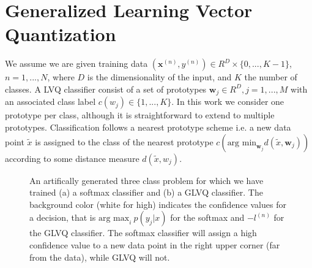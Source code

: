 \documentclass{esannV2}
\begin{document}
\section{Generalized Learning Vector Quantization}
We assume we are given training data $(\mathbf{x}^{(n)}, y^{(n)}) \in R^D \times \{0, ..., K-1\}$, $n=1, ..., N$, where $D$ is the dimensionality of the input, and $K$ the number of classes. A LVQ classifier consist of a set of prototypes ${\mathbf{w}_j} \in R^D, j=1, ..., M$ with an associated class label $c(w_j) \in \{1, ..., K\}$. In this work we consider one prototype per class, although it is straightforward to extend to multiple prototypes. Classification follows a nearest prototype scheme i.e. a new data point $\tilde{x}$ is assigned to the class of the nearest prototype $c(\mbox{arg min}_{\mathbf{w}_j} d(\tilde{x}, \mathbf{w}_j))$ according to some distance measure $d(\tilde{x}, w_j)$. 
\begin{figure}[t]
\caption{An artifically generated three class problem for which we have trained (a) a softmax classifier and (b) a GLVQ classifier. The background color (white for high) indicates the confidence values for a decision, that is $\mbox{arg max}_i\ p(y_j|x)$ for the softmax and $-l^{(n)}$ for the GLVQ classifier\protect\footnotemark. The softmax classifier will assign a high confidence value to a new data point in the right upper corner (far from the data), while GLVQ will not. }
\label{figure:diff_glvq_softmax}
\end{figure}
\end{document}
